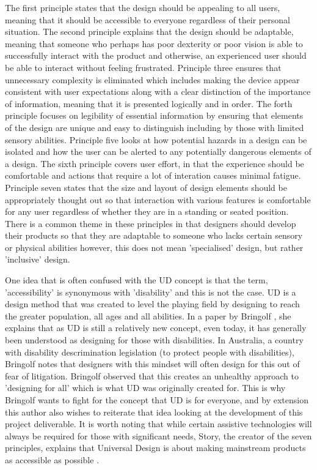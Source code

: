 The first principle states that the design should be appealing to all users, meaning that it should be accessible to everyone regardless of their personal situation.
The second principle explains that the design should be adaptable, meaning that someone who perhaps has poor dexterity or poor vision is able to successfully interact with the product and otherwise, an experienced user should be able to interact without feeling frustrated. %
Principle three ensures that unnecessary complexity is eliminated which includes making the device appear consistent with user expectations along with a clear distinction of the importance of information, meaning that it is presented logically and in order.
The forth principle focuses on legibility of essential information by ensuring that elements of the design are unique and easy to distinguish including by those with limited sensory abilities.
Principle five looks at how potential hazards in a design can be isolated and how the user can be alerted to any potentially dangerous elements of a design.
The sixth principle covers user effort, in that the experience should be comfortable and actions that require a lot of interation causes minimal fatigue.
Principle seven states that the size and layout of design elements should be appropriately thought out so that interaction with various features is comfortable for any user regardless of whether they are in a standing or seated position.
There is a common theme in these principles in that designers should develop their products so that they are adaptable to someone who lacks certain sensory or physical abilities however, this does not mean 'specialised' design, but rather 'inclusive' design.

One idea that is often confused with the UD concept is that the term, 'accessibility' is synonymous with 'disability' and this is not the case.
UD is a design method that was created to level the playing field by designing to reach the greater population, all ages and all abilities.
In a paper by Bringolf \cite{accessible}, she explains that as UD is still a relatively new concept, even today, it has generally been understood as designing for those with disabilities.
In Australia, a country with disability descrimination legislation (to protect people with disabilities), Bringolf notes that designers with this mindset will often design for this out of fear of litigation.
Bringolf observed that this creates an unhealthy approach to 'designing for all' which is what UD was originally created for. %
This is why Bringolf wants to fight for the concept that UD is for everyone, and by extension this author also wishes to reiterate that idea looking at the development of this project deliverable. %
It is worth noting that while certain assistive technologies will always be required for those with significant needs, Story, the creator of the seven principles, explains that Universal Design is about making mainstream products as accessible as possible \cite{sevenprinciples}.

